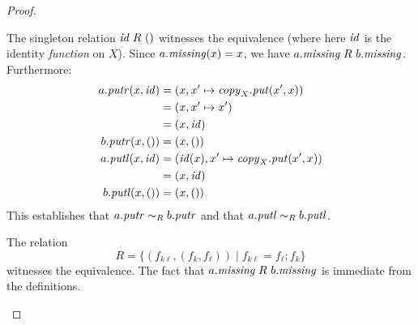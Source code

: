 \begin{defn}[$R$-similarity]
\begin{theorem}
\begin{lemma}
\begin{theorem}[No products]
\begin{lemma}
\begin{defn}
\begin{theorem}
\begin{theorem}
\begin{corollary}[Hylomorphism]
\begin{defn}
\begin{defn}
\begin{defn}[Symmetrization]
\begin{proof}
\begin{longenum}
\item The singleton
relation $\mathit{id} \mathrel{R_{}} {()}$ witnesses the equivalence (where here $\mathit{id}$ is
the identity \emph{function} on $X$). Since $a.\mathit{missing}(x) =
x$, we have $a.\mathit{missing} \mathrel{R_{}} b.\mathit{missing}$. Furthermore:
\begin{align*}
    a.\mathit{putr}(x,\mathit{id}) &= (x,x' \mapsto \mathit{copy}_X.\mathit{put}(x',x)) \\
    &= (x, x' \mapsto x') \\
    &= (x, \mathit{id}) \\
    b.\mathit{putr}(x,{()}) &= (x,{()}) \\
    a.\mathit{putl}(x,\mathit{id}) &= (\mathit{id}(x),x' \mapsto \mathit{copy}_X.\mathit{put}(x',x)) \\
    &= (x,\mathit{id}) \\
    b.\mathit{putl}(x,{()}) &= (x,{()})
\end{align*}
This establishes that $a.\mathit{putr} \sim_R b.\mathit{putr}$ and that $a.\mathit{putl} \sim_R
b.\mathit{putl}$.

\item The relation
\[R = \{(f_{k\ell},(f_k,f_\ell)) \mid f_{k\ell} = f_\ell;f_k\}\]
witnesses the equivalence. The fact that $a.\mathit{missing} \mathrel{R_{}} b.\mathit{missing}$ is
immediate from the definitions.


\end{longenum}
\end{proof}
\end{defn}
\end{defn}
\end{defn}
\end{corollary}
\end{theorem}
\end{theorem}
\end{defn}
\end{lemma}
\end{theorem}
\end{lemma}
\end{theorem}
\end{defn}

